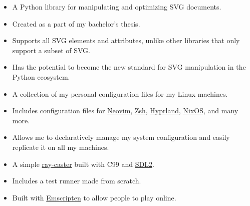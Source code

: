 \documentclass[10pt,a4paper,ragged2e,withhyper]{altacv}
\begin{document}
\begin{paracol}{2}
	\medskip

	\medskip

	\begin{itemize}
		\item A Python library for manipulating and optimizing SVG documents.
		\item Created as a part of my bachelor's thesis.
		\item Supports all SVG elements and attributes, unlike other libraries that only support a subset of SVG.
		\item Has the potential to become the new standard for SVG manipulation in the Python ecosystem.
	\end{itemize}

	\divider

	\begin{itemize}
		\item A collection of my personal configuration files for my Linux machines.
		\item Includes configuration files for \href{https://neovim.io/}{Neovim}, \href{https://www.zsh.org/}{Zsh}, \href{https://hyprland.org/}{Hyprland}, \href{https://nixos.org/}{NixOS}, and many more.
		\item Allows me to declaratively manage my system configuration and easily replicate it on all my machines.
	\end{itemize}

	\divider

	\begin{itemize}
		\item A simple \href{https://en.wikipedia.org/wiki/Ray_casting}{ray-caster} built with C99 and \href{https://www.libsdl.org/}{SDL2}.
		\item Includes a test runner made from scratch.
		\item Built with \href{https://emscripten.org/}{Emscripten} to allow people to play online.
	\end{itemize}
\end{paracol}
\end{document}
